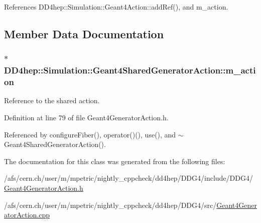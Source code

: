 References DD4hep::Simulation::Geant4Action::addRef(), and m\_\-action.

\subsection{Member Data Documentation}
\hypertarget{class_d_d4hep_1_1_simulation_1_1_geant4_shared_generator_action_ac161fab3e1f99c7dc5a8555bacb904a2}{
\subsubsection[{m\_\-action}]{$\ast$ {\bf DD4hep::Simulation::Geant4SharedGeneratorAction::m\_\-action}}}
\label{class_d_d4hep_1_1_simulation_1_1_geant4_shared_generator_action_ac161fab3e1f99c7dc5a8555bacb904a2}


Reference to the shared action. 

Definition at line 79 of file Geant4GeneratorAction.h.

Referenced by configureFiber(), operator()(), use(), and $\sim$Geant4SharedGeneratorAction().

The documentation for this class was generated from the following files:\begin{DoxyCompactItemize}
\item 
/afs/cern.ch/user/m/mpetric/nightly\_\-cppcheck/dd4hep/DDG4/include/DDG4/\hyperlink{_geant4_generator_action_8h}{Geant4GeneratorAction.h}\item 
/afs/cern.ch/user/m/mpetric/nightly\_\-cppcheck/dd4hep/DDG4/src/\hyperlink{_geant4_generator_action_8cpp}{Geant4GeneratorAction.cpp}\end{DoxyCompactItemize}
